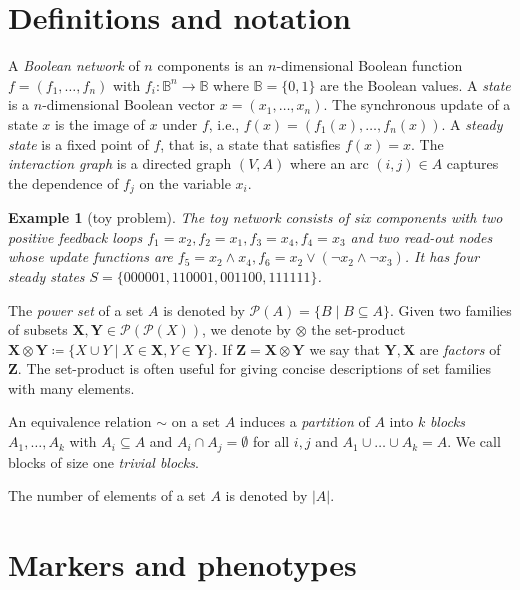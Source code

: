 \documentclass[11pt]{article}
\newtheorem{example}{Example}[section]
\begin{document}
    \section{Definitions and notation}\label{sec:definitions-and-notation}
    A \emph{Boolean network} of $n$ components is an $n$-dimensional Boolean function $f=(f_1, \dots, f_n)$ with $f_i: \mathbb B^n \rightarrow \mathbb B$ where $\mathbb B = \{0,1\}$ are the Boolean values.
    A \emph{state} is a $n$-dimensional Boolean vector $x=(x_1, \dots, x_n)$.
    The synchronous update of a state $x$ is the image of $x$ under $f$, i.e., $f(x)=(f_1(x), \dots, f_n(x))$.
    A \emph{steady state} is a fixed point of $f$, that is, a state that satisfies $f(x) = x$.
    The \emph{interaction graph} is a directed graph $(V,A)$ where an arc $(i,j) \in A$ captures the dependence of $f_j$ on the variable $x_i$.

    \begin{example}[toy problem]
        The toy network consists of six components with two positive feedback loops $f_1=x_2, f_2=x_1, f_3=x_4, f_4=x_3$ and two read-out nodes whose update functions are $f_5=x_2 \wedge x_4, f_6=x_2 \vee (\neg x_2 \wedge \neg x_3)$.
        It has four steady states $S=\{000001, 110001, 001100, 111111\}$.
    \end{example}

    The \emph{power set} of a set $A$ is denoted by $\mathcal P(A) = \{B \mid B\subseteq A\}$.
    Given two families of subsets $\mathbf X, \mathbf Y \in \mathcal P (\mathcal P (X))$, we denote by $\otimes$ the set-product $\mathbf X \otimes \mathbf Y \coloneqq \{X \cup Y \mid X \in \mathbf X, Y \in \mathbf Y\}$.
    If $\mathbf Z = \mathbf X \otimes \mathbf Y$ we say that $\mathbf Y, \mathbf X$ are \emph{factors} of $\mathbf Z$.
    The set-product is often useful for giving concise descriptions of set families with many elements.

    An equivalence relation $\sim$ on a set $A$ induces a \emph{partition} of $A$ into $k$ \emph{blocks} $A_1, \dots, A_k$ with $A_i \subseteq A$ and $A_i\cap A_j=\emptyset$ for all $i,j$ and $A_1\cup \dots \cup A_k=A$.
    We call blocks of size one \emph{trivial blocks}.

    The number of elements of a set $A$ is denoted by $|A|$.

    \section{Markers and phenotypes}\label{sec:markers-and-phenotypes}
\end{document}
